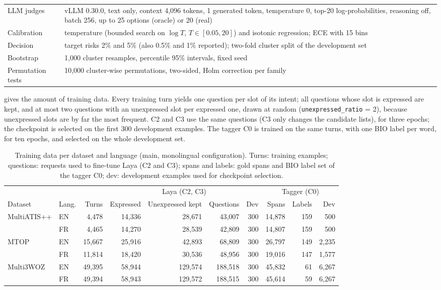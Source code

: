 \begin{table}[pos=h]
\begin{tabular}{@{}p{5.2cm}p{9.3cm}@{}}
LLM judges & vLLM 0.30.0, text only, context 4,096 tokens, 1 generated token, temperature 0, top-20 log-probabilities, reasoning off, batch 256, up to 25 options (oracle) or 20 (real) \\
Calibration & temperature (bounded search on $\log T$, $T\in[0.05,20]$) and isotonic regression; ECE with 15 bins \\
Decision & target risks 2\% and 5\% (also 0.5\% and 1\% reported); two-fold cluster split of the development set \\
Bootstrap & 1,000 cluster resamples, percentile 95\% intervals, fixed seed \\
Permutation tests & 10,000 cluster-wise permutations, two-sided, Holm correction per family \\
\bottomrule
\end{tabular}
\end{table}

 gives the amount of training data. Every training turn yields one question per slot of its intent; all questions whose slot is expressed are kept, and at most two questions with an unexpressed slot per expressed one, drawn at random (\texttt{unexpressed\_ratio} = 2), because unexpressed slots are by far the most frequent. C2 and C3 use the same questions (C3 only changes the candidate lists), for three epochs; the checkpoint is selected on the first 300 development examples. The tagger C0 is trained on the same turns, with one BIO label per word, for ten epochs, and selected on the whole development set.

\begin{table}[pos=h]
\centering
\small
\caption{Training data per dataset and language (main, monolingual configuration). Turns: training examples; questions: requests used to fine-tune Laya (C2 and C3); spans and labels: gold spans and BIO label set of the tagger C0; dev: development examples used for checkpoint selection.}
\label{tab:trainsizes}
\setlength{\tabcolsep}{4pt}
\begin{tabular}{@{}llrrrrrrrr@{}}
\toprule
 & & & \multicolumn{4}{c}{Laya (C2, C3)} & \multicolumn{3}{c}{Tagger (C0)} \\
\cmidrule(lr){4-7}\cmidrule(l){8-10}
Dataset & Lang. & Turns & Expressed & Unexpressed kept & Questions & Dev & Spans & Labels & Dev \\
\midrule
MultiATIS++ & EN & 4,478 & 14,336 & 28,671 & 43,007 & 300 & 14,878 & 159 & 500 \\
            & FR & 4,465 & 14,270 & 28,539 & 42,809 & 300 & 14,807 & 159 & 500 \\
MTOP        & EN & 15,667 & 25,916 & 42,893 & 68,809 & 300 & 26,797 & 149 & 2,235 \\
            & FR & 11,814 & 18,420 & 30,536 & 48,956 & 300 & 19,016 & 147 & 1,577 \\
Multi3WOZ   & EN & 49,395 & 58,944 & 129,574 & 188,518 & 300 & 45,832 & 61 & 6,267 \\
            & FR & 49,394 & 58,943 & 129,572 & 188,515 & 300 & 45,614 & 59 & 6,267 \\
\bottomrule
\end{tabular}
\end{table}
